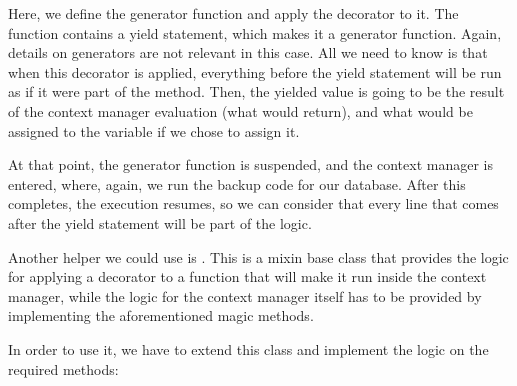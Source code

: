 \documentclass[a4paper,10pt,english]{sphinxmanual}
\begin{document}
Here, we define the generator function and apply the  decorator to it. The function
contains a yield statement, which makes it a generator function. Again, details on generators are not relevant in this case. All we need to know is
that when this decorator is applied, everything before the yield statement will be run as if it were part of the
 method. Then, the yielded value is going to be the result of the context manager evaluation (what
 would return), and what would be assigned to the variable if we chose to assign it.

At that point, the generator function is suspended, and the context manager is entered, where, again, we run the backup
code for our database. After this completes, the execution resumes, so we can consider that every line that comes after
the yield statement will be part of the  logic.

Another helper we could use is . This is a mixin base class that provides the logic for
applying a decorator to a function that will make it run inside the context manager, while the logic for the context
manager itself has to be provided by implementing the aforementioned magic methods.

In order to use it, we have to extend this class and implement the logic on the required methods:

\begin{sphinxVerbatim}[commandchars=\\\{\}]
 

     

        

 
\end{sphinxVerbatim}
\end{document}

